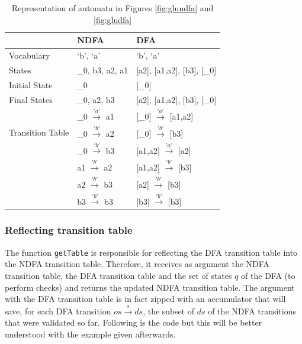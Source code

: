 \begin{table}
  \begin{center}
    \begin{tabular}{ | p{3cm} |p{4cm}||p{4cm}|  }
    \hline
         & NDFA & DFA \\ [1ex]
        \hline
        \hline
        Vocabulary & `b', `a' & `b', `a'\\ [0.7ex]
        \hline
        States & \_0, b3, a2, a1 & [a2], [a1,a2], [b3], [\_0]\\ [0.7ex]
        \hline
        Initial State & \_0 & [\_0] \\ [0.7ex]
        \hline
        Final States & \_0, a2, b3 & [a2], [a1,a2], [b3], [\_0] \\ [0.7ex]
        \hline
        \multirow{3}{5em}{Transition Table} & \_0 $\xrightarrow{'a'}$ a1 & [\_0] $\xrightarrow{'a'}$ [a1,a2]\\
        & \_0 $\xrightarrow{'b'}$ a2 & [\_0]    $\xrightarrow{'b'}$ [b3]\\
        & \_0 $\xrightarrow{'b'}$ b3 & [a1,a2]  $\xrightarrow{'a'}$ [a2]\\
        & a1  $\xrightarrow{'b'}$ a2 & [a1,a2]  $\xrightarrow{'b'}$ [b3]\\
        & a2  $\xrightarrow{'b'}$ b3 & [a2]     $\xrightarrow{'b'}$ [b3]\\
        & b3  $\xrightarrow{'b'}$ b3 & [b3]     $\xrightarrow{'b'}$ [b3]\\
        \hline
        \end{tabular}
  \end{center}
  \caption{Representation of automata in Figures \ref{fig:glundfa} and \ref{fig:gludfa}}
  \label{tablestruct}
\end{table}

\subsubsection{Reflecting transition table}
The function \texttt{getTable} is responsible for reflecting the DFA transition table into the NDFA transition table. Therefore, it receives as argument the NDFA transition table, the DFA transition table and the set of states $q$ of the DFA (to perform checks) and returns the updated NDFA transition table. The argument with the DFA transition table is in fact zipped with an accumulator that will save, for each DFA transition $os \xrightarrow{s} ds$, the subset of $ds$ of the NDFA transitions that were validated so far. Following is the code but this will be better understood with the example given afterwards. 

